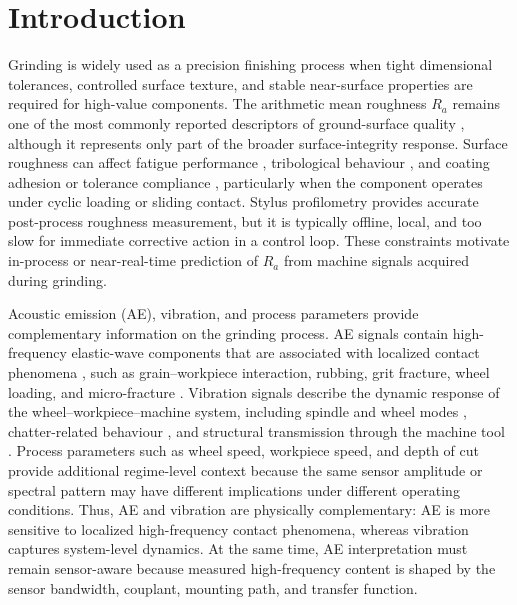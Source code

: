\section{Introduction}\label{introduction}

Grinding is widely used as a precision finishing process when tight dimensional tolerances, controlled surface texture, and stable near-surface properties are required for high-value components. The arithmetic mean roughness \(R_a\) remains one of the most commonly reported descriptors of ground-surface quality \cite{Brinksmeier2006,Jawahir2011}, although it represents only part of the broader surface-integrity response. Surface roughness can affect fatigue performance \cite{Novovic2004}, tribological behaviour \cite{Brinksmeier2006}, and coating adhesion or tolerance compliance \cite{Jawahir2011}, particularly when the component operates under cyclic loading or sliding contact. Stylus profilometry provides accurate post-process roughness measurement, but it is typically offline, local, and too slow for immediate corrective action in a control loop. These constraints motivate in-process or near-real-time prediction of \(R_a\) from machine signals acquired during grinding.

Acoustic emission (AE), vibration, and process parameters provide complementary information on the grinding process. AE signals contain high-frequency elastic-wave components that are associated with localized contact phenomena \cite{Dornfeld1992}, such as grain--workpiece interaction, rubbing, grit fracture, wheel loading, and micro-fracture \cite{Teti2010}. Vibration signals describe the dynamic response of the wheel--workpiece--machine system, including spindle and wheel modes \cite{Altintas2004}, chatter-related behaviour \cite{Quintana2011}, and structural transmission through the machine tool \cite{Hassui2003}. Process parameters such as wheel speed, workpiece speed, and depth of cut provide additional regime-level context because the same sensor amplitude or spectral pattern may have different implications under different operating conditions. Thus, AE and vibration are physically complementary: AE is more sensitive to localized high-frequency contact phenomena, whereas vibration captures system-level dynamics. At the same time, AE interpretation must remain sensor-aware because measured high-frequency content is shaped by the sensor bandwidth, couplant, mounting path, and transfer function.

